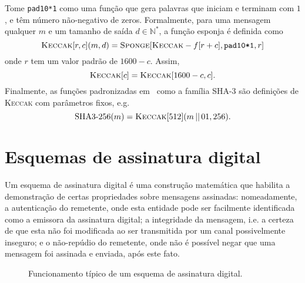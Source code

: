 \documentclass[12pt,notitlepage]{report}
\newcommand{\pk}{\mathcal{P}_k}
\newcommand{\sk}{\mathcal{S}_k}
\newcommand{\concat}{\, \vert \vert \,}
\newcommand{\binwds}[1]{\{0, 1\}^{#1}}
\begin{document}
Tome \texttt{pad10*1} como uma função que gera palavras que iniciam e terminam
com $1$, e têm número não-negativo de zeros. Formalmente, para uma mensagem
qualquer $m$ e um tamanho de saída $d \in \mathbb{N}^{*}$, a função esponja é
definida como
\begin{equation}
  \textsc{Keccak}[r, c](m, d)
    = \textsc{Sponge}[\textsc{Keccak}-f[r + c], \texttt{pad10*1}, r]
\end{equation}
onde $r$ tem um valor padrão de $1600 - c$. Assim,
\begin{equation}
  \textsc{Keccak}[c] = \textsc{Keccak}[1600 - c, c].
\end{equation}
Finalmente, as funções padronizadas em~\cite{Dworkin2015} como a família SHA-3
são definições de \textsc{Keccak} com parâmetros fixos, e.g.
\begin{equation}
  \text{SHA3-}256(m) = \textsc{Keccak}[512](m \concat 01, 256).
\end{equation}

\section{Esquemas de assinatura digital}

Um esquema de assinatura digital é uma construção matemática que habilita a
demonstração de certas propriedades sobre mensagens assinadas: nomeadamente, a
autenticação do remetente, onde esta entidade pode ser facilmente identificada
como a emissora da assinatura digital; a integridade da mensagem, i.e. a
certeza de que esta não foi modificada ao ser transmitida por um canal
possivelmente inseguro; e o não-repúdio do remetente, onde não é possível negar
que uma mensagem foi assinada e enviada, após este fato.

\begin{figure}[ht]
  \centering
  \caption{Funcionamento típico de um esquema de assinatura digital.}
  \label{fig:2}
\end{figure}
\end{document}
